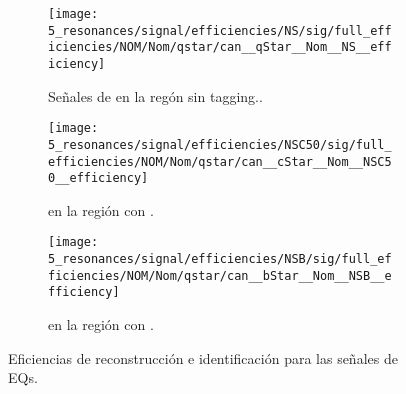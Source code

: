 \begin{figure}[ht!]
    \centering
    \begin{subfigure}[t]{0.32\linewidth}
        \centering
        \texttt{[image: 5\_resonances/signal/efficiencies/NS/sig/full\_efficiencies/NOM/Nom/qstar/can\_\_qStar\_\_Nom\_\_NS\_\_efficiency]}
        \caption{Señales de \qstar en la regón sin tagging..}
        \label{fig:signals:acc_eff:efficiencies:qstar}
    \end{subfigure}
    \hfill
    \begin{subfigure}[t]{0.32\linewidth}
        \centering
        \texttt{[image: 5\_resonances/signal/efficiencies/NSC50/sig/full\_efficiencies/NOM/Nom/qstar/can\_\_cStar\_\_Nom\_\_NSC50\_\_efficiency]}
        \caption{\cstar en la región con \ctagging.}
        \label{fig:signals:acc_eff:efficiencies:cstar}
    \end{subfigure}
    \hfill
    \begin{subfigure}[t]{0.32\linewidth}
        \centering
        \texttt{[image: 5\_resonances/signal/efficiencies/NSB/sig/full\_efficiencies/NOM/Nom/qstar/can\_\_bStar\_\_Nom\_\_NSB\_\_efficiency]}
        \caption{\bstar en la región con \btagging.}
        \label{fig:signals:acc_eff:efficiencies:bstar}
    \end{subfigure}
    \caption{Eficiencias de reconstrucción e identificación para las señales de \acp{EQ}.}
    \label{fig:signals:acc_eff:efficiencies}
\end{figure}


